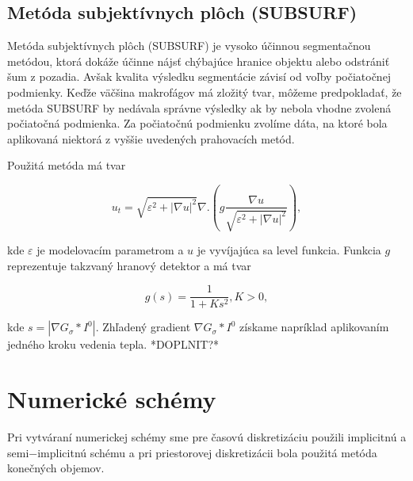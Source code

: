 \documentclass[a4paper,11pt,oneside]{article}%
\def\epsilon{\varepsilon}
\begin{document}
\subsection{Metóda subjektívnych plôch (SUBSURF)} 

Metóda subjektívnych plôch (SUBSURF) je vysoko účinnou segmentačnou metódou, ktorá dokáže účinne nájsť chýbajúce hranice objektu alebo odstrániť šum z pozadia. Avšak kvalita výsledku segmentácie závisí od voľby počiatočnej podmienky. Keďže väčšina makrofágov má zložitý tvar, môžeme predpokladať, že metóda SUBSURF by nedávala správne výsledky ak by nebola vhodne zvolená počiatočná podmienka. Za počiatočnú podmienku zvolíme dáta, na ktoré bola aplikovaná niektorá z vyššie uvedených prahovacích metód.

Použitá metóda má tvar

\begin{equation} \label{eq:subsurf}
u_t = \sqrt{\epsilon^2 + |\nabla u|^2}\nabla.(g \frac{\nabla u}{\sqrt{\epsilon^2 + |\nabla u|^2}}),
\end{equation}

kde $\epsilon$ je modelovacím parametrom a $u$ je vyvíjajúca sa level funkcia. Funkcia $g$ reprezentuje takzvaný hranový detektor a má tvar

\begin{equation}
g(s) = \frac{1}{1+Ks^2}, K > 0,
\end{equation}

kde $s = |\nabla G_\sigma*I^0|$. Zhľadený gradient $\nabla G_\sigma*I^0$ získame napríklad aplikovaním jedného kroku vedenia tepla. *DOPLNIT?*




\newpage
\section{Numerické schémy}

Pri vytváraní numerickej schémy sme pre časovú diskretizáciu použili implicitnú a semi$-$implicitnú schému a pri priestorovej diskretizácii bola použitá metóda konečných objemov.

\end{document}
